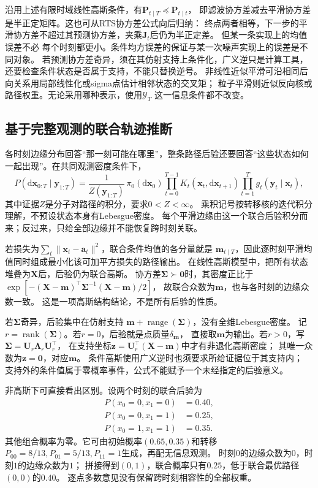 沿用上述有限时域线性高斯条件，有$\bm P_{t\mid T}\preceq\bm P_{t\mid t}$，
即滤波协方差减去平滑协方差是半正定矩阵。这也可从RTS协方差公式向后归纳：
终点两者相等，下一步的平滑协方差不超过其预测协方差，夹乘$\bm J_t$后仍为半正定差。
但某一条实现上的均值误差不必
每个时刻都更小。条件均方误差的保证与某一次噪声实现上的误差是不同对象。
若预测协方差奇异，须在其仿射支持上条件化，广义逆只是计算工具，
还要检查条件状态是否属于支持，不能只替换逆号。
非线性近似平滑可沿相同后向关系用局部线性化或sigma点估计相邻状态的交叉矩；
粒子平滑则近似反向核或路径权重。无论采用哪种表示，使用$\mathcal Y_T$
这一信息条件都不改变。

\subsection{基于完整观测的联合轨迹推断}
各时刻边缘分布回答“那一刻可能在哪里”，整条路径后验还要回答“这些状态如何
一起出现”。在共同观测密度条件下，
\begin{equation}
 P(\mathrm d\bm x_{0:T}\mid\bm y_{1:T})
   =\frac1{Z(\bm y_{1:T})}\,
      \pi_0(\mathrm d\bm x_0)
      \prod_{t=0}^{T-1}K_t(\bm x_t,\mathrm d\bm x_{t+1})
      \prod_{t=1}^Tg_t(\bm y_t\mid\bm x_t),
 \label{eq:action-state-trajectory-posterior}
\end{equation}
其中证据$Z$是分子对路径的积分，要求$0<Z<\infty$。
乘积记号按转移核的迭代积分理解，不预设状态本身有Lebesgue密度。
每个平滑边缘由这一个联合后验积分而来；反过来，只给全部边缘并不能恢复跨时刻关联。

若损失为$\sum_t\|\bm x_t-\bm a_t\|^2$，联合条件均值的各分量就是
$\bm m_{t\mid T}$，因此逐时刻平滑均值同时组成最小化该可加平方损失的路径输出。
在线性高斯模型中，把所有状态堆叠为$\bm X$后，后验仍为联合高斯。
协方差$\bm\Sigma\succ\bm0$时，其密度正比于
$\exp[-(\bm X-\bm m)^\top\bm\Sigma^{-1}(\bm X-\bm m)/2]$，
故联合众数为$\bm m$，也与各时刻的边缘众数一致。
这是一项高斯结构结论，不是所有后验的性质。

若$\bm\Sigma$奇异，后验集中在仿射支持
$\bm m+\operatorname{range}(\bm\Sigma)$，没有全维Lebesgue密度。
记$r=\operatorname{rank}(\bm\Sigma)$。若$r=0$，后验就是点质量$\delta_{\bm m}$，
直接取$\bm m$为输出。若$r>0$，写$\bm\Sigma=\bm U_r\bm\Lambda_r\bm U_r^\top$，
在支持坐标$\bm z=\bm U_r^\top(\bm X-\bm m)$中才有非退化高斯密度；
其唯一众数为$\bm z=\bm0$，对应$\bm m$。
条件高斯使用广义逆时也须要求所给证据位于其支持内；
支持外的条件值属于零概率事件，公式不能赋予一个未经指定的后验意义。

非高斯下可直接看出区别。设两个时刻的联合后验为
\[
 \begin{aligned}
  P(x_0=0,x_1=0)&=0.40,\\
  P(x_0=0,x_1=1)&=0.25,\\
  P(x_0=1,x_1=1)&=0.35.
 \end{aligned}
\]
其他组合概率为零。它可由初始概率$(0.65,0.35)$和转移
$P_{00}=8/13,P_{01}=5/13,P_{11}=1$生成，再配无信息观测。
时刻$0$的边缘众数为$0$，时刻$1$的边缘众数为$1$；
拼接得到$(0,1)$，联合概率只有$0.25$，低于联合最优路径$(0,0)$的$0.40$。
逐点多数意见没有保留跨时刻相容性的全部权重。


